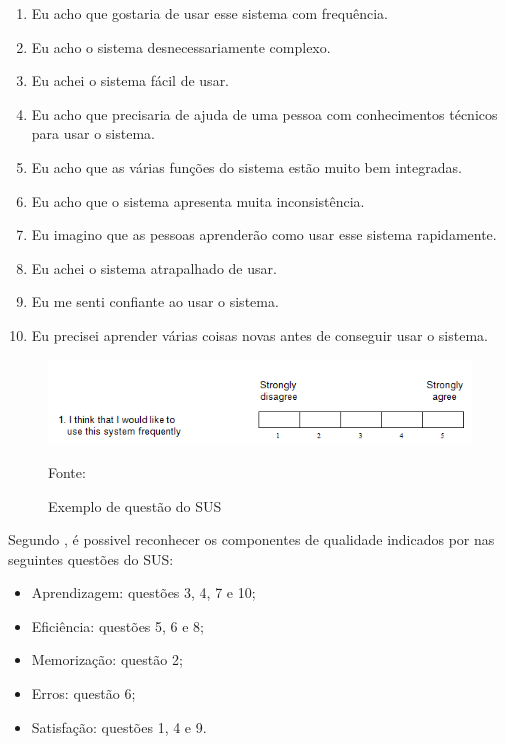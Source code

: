 \documentclass[
	12pt,				%
	openany,			%
	oneside,			%
	a4paper,			%
	english,			%
	french,				%
	spanish,			%
	brazil				%
	]{abntex2}
\begin{document}
\begin{enumerate}
\item Eu acho que gostaria de usar esse sistema com frequência.
\item Eu acho o sistema desnecessariamente complexo.
\item Eu achei o sistema fácil de usar.
\item Eu acho que precisaria de ajuda de uma pessoa com conhecimentos técnicos para usar o sistema.
\item Eu acho que as várias funções do sistema estão muito bem integradas.
\item Eu acho que o sistema apresenta muita inconsistência.
\item Eu imagino que as pessoas aprenderão como usar esse sistema rapidamente.
\item Eu achei o sistema atrapalhado de usar.
\item Eu me senti confiante ao usar o sistema.
\item Eu precisei aprender várias coisas novas antes de conseguir usar o sistema.

\end{enumerate}

\begin{figure}[H]
    \centering
\caption{Exemplo de questão do SUS}
\includegraphics[width=13cm]{figuras/sus.png}
\par
 Fonte: \cite{BROOKE}
\end{figure}

Segundo , é possivel reconhecer os componentes de qualidade indicados por  nas seguintes questões do SUS:


\begin{itemize}
\item Aprendizagem: questões 3, 4, 7 e 10;
\item Eficiência: questões 5, 6 e 8;
\item Memorização: questão 2;
\item Erros: questão 6;
\item Satisfação: questões 1, 4 e 9.

\end{itemize}
\end{document}
